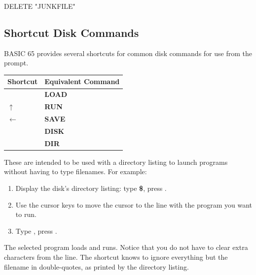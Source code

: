\begin{screencode}
DELETE "JUNKFILE"
\end{screencode}


\subsection{Shortcut Disk Commands}

BASIC 65 provides several shortcuts for common disk commands for use from the  prompt.

\begin{center}
\begin{tabular}{|l|l|}
\hline
{\bf Shortcut} & {\bf Equivalent Command} \\
\hline
\screentextwide{/} & {\bf LOAD} \\
\hline
$\uparrow$ & {\bf RUN} \\
\hline
$\leftarrow$ & {\bf SAVE} \\
\hline
\screentextwide{@} & {\bf DISK} \\
\hline
\screentextwide{\$} & {\bf DIR} \\
\hline
\end{tabular}
\end{center}

These are intended to be used with a directory listing to launch programs without having to type filenames. For example:

\begin{enumerate}
\item Display the disk's directory listing: type {\bf \$}, press .
\item Use the cursor keys to move the cursor to the line with the program you want to run.
\item Type {\bf \screentext{$\uparrow$}}, press .
\end{enumerate}

The selected program loads and runs. Notice that you do not have to clear extra characters from the line. The shortcut knows to ignore everything but the filename in double-quotes, as printed by the directory listing.
